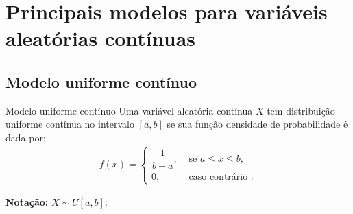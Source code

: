 \documentclass[9pt]{beamer}
\DeclareMathOperator{\espe}{E}
\DeclareMathOperator{\vari}{Var}
\begin{document}
\section{Principais modelos para variáveis aleatórias contínuas}

\subsection{Modelo uniforme contínuo}

\begin{frame}{Modelo uniforme contínuo}
 Uma variável aleatória contínua $X$ tem distribuição uniforme contínua no intervalo $[a,b]$ se sua função densidade de probabilidade é dada por:
 \begin{align*}
  f(x) = \begin{cases}
          \dfrac{1}{b-a}, & \mbox{ se } a \leq x \leq b,\\
          0, & \mbox{ caso contrário }.
         \end{cases}
 \end{align*}
\begin{figure}[ht]
\centering
\caption{}
 \end{figure}
 \vfill
 
 \textbf{Notação:} $X \sim U[a, b]$.
 
\end{frame}
\end{document}
